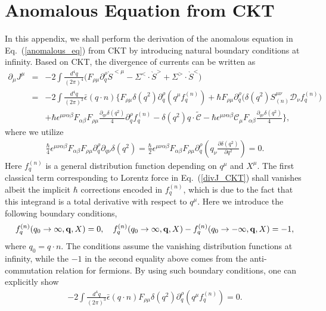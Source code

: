 \documentclass[aps,prd,showkeys,preprint,amsmath,amssymb,nofootinbib]{revtex4-1}
\begin{document}
\section{Anomalous Equation from CKT}
In this appendix, we shall perform the derivation of the anomalous equation in Eq.~(\ref{anomalous_eq}) from CKT by introducing natural boundary conditions at infinity. Based on CKT, the divergence of currents can be written as
\begin{eqnarray}\nonumber\label{divJ_CKT}
\partial_{\mu}J^{\mu}&=&-2\int\frac{d^4q}{(2\pi)^4}\Big(F_{\rho\mu}\partial_q^{\rho}\grave{S}^{<\mu}
-\Sigma^<\cdot \grave{S}^>+\Sigma^>\cdot \grave{S}^<
\Big)
\\\nonumber
&=&-2\int\frac{d^4q}{(2\pi)^3}\bar{\epsilon}(q\cdot n)\Bigg\{F_{\rho\mu}\delta(q^2)\partial^{\rho}_{q}(q^{\mu}f^{(n)}_q)+\hbar F_{\rho\mu}\partial^{\rho}_{q}\Big(\delta(q^2)S^{\mu\nu}_{(n)}\mathcal{D}_{\nu}f^{(n)}_q\Big) 
\\
&&+\hbar\epsilon^{\mu\nu\alpha\beta}F_{\alpha\beta}F_{\rho\mu}\frac{\partial_{q\nu}\delta(q^2)}{4}\partial^{\rho}_qf^{(n)}_q
-\delta(q^2)q\cdot\tilde{\mathcal{C}}-\hbar\epsilon^{\mu\nu\alpha\beta}\mathcal{C}_{\mu}F_{\alpha\beta}\frac{\partial_{q\nu}\delta(q^2)}{4}
\Bigg\},
\end{eqnarray}
where we utilize
\begin{eqnarray}
\frac{\hbar}{4}\epsilon^{\mu\nu\alpha\beta}F_{\alpha\beta}F_{\rho\mu}\partial^{\rho}_q\partial_{q\nu}\delta(q^2)=\frac{\hbar}{2}\epsilon^{\mu\nu\alpha\beta}F_{\alpha\beta}F_{\rho\mu}\partial^{\rho}_q
\left(q_{\nu}\frac{\partial\delta(q^2)}{\partial q^2}\right)=0.
\end{eqnarray}
Here $f^{(n)}_q$ is a general distribution function depending on $q^{\mu}$ and $X^{\mu}$. 
The first classical term corresponding to Lorentz force in Eq.~(\ref{divJ_CKT}) shall vanishes albeit the implicit $\hbar$ corrections encoded in $f^{(n)}_q$, which is due to the fact that this integrand is a total derivative with respect to $q^{\mu}$. Here we introduce the following boundary conditions, 
\begin{eqnarray}
f^{(n)}_q(q_0\rightarrow\infty,{\bf q},X)=0,\quad
f^{(n)}_q(q_0\rightarrow\infty,{\bf q},X)-f^{(n)}_q(q_0\rightarrow-\infty,{\bf q},X)=-1,
\end{eqnarray}
where $q_0=q\cdot n$. 
The conditions assume the vanishing distribution functions at infinity, while the $-1$ in the second equality above comes from the anti-commutation relation for fermions. By using such boundary conditions, one can explicitly show
\begin{eqnarray}
-2\int\frac{d^4q}{(2\pi)^3}\bar{\epsilon}(q\cdot n)F_{\rho\mu}\delta(q^2)\partial^{\rho}_{q}(q^{\mu}f^{(n)}_q)=0.
\end{eqnarray}  
\end{document}

